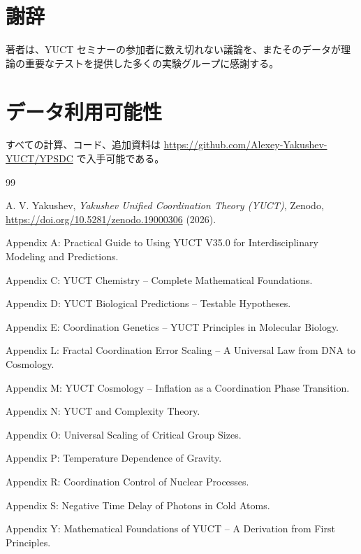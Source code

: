\documentclass[12pt,a4paper]{article}
\theoremstyle{remark}
\begin{document}
	\section*{謝辞}
	
	著者は、YUCT セミナーの参加者に数え切れない議論を、またそのデータが理論の重要なテストを提供した多くの実験グループに感謝する。
	
	\section*{データ利用可能性}
	
	すべての計算、コード、追加資料は \url{https://github.com/Alexey-Yakushev-YUCT/YPSDC} で入手可能である。
	
	\begin{thebibliography}{99}
		
		A. V. Yakushev, \emph{Yakushev Unified Coordination Theory (YUCT)}, Zenodo, \url{https://doi.org/10.5281/zenodo.19000306} (2026).
		
		Appendix A: Practical Guide to Using YUCT V35.0 for Interdisciplinary Modeling and Predictions.
		
		Appendix C: YUCT Chemistry -- Complete Mathematical Foundations.
		
		Appendix D: YUCT Biological Predictions -- Testable Hypotheses.
		
		Appendix E: Coordination Genetics -- YUCT Principles in Molecular Biology.
		
		Appendix L: Fractal Coordination Error Scaling -- A Universal Law from DNA to Cosmology.
		
		Appendix M: YUCT Cosmology -- Inflation as a Coordination Phase Transition.
		
		Appendix N: YUCT and Complexity Theory.
		
		Appendix O: Universal Scaling of Critical Group Sizes.
		
		Appendix P: Temperature Dependence of Gravity.
		
		Appendix R: Coordination Control of Nuclear Processes.
		
		Appendix S: Negative Time Delay of Photons in Cold Atoms.
		
		Appendix Y: Mathematical Foundations of YUCT -- A Derivation from First Principles.
		

\end{thebibliography}
\end{document}
